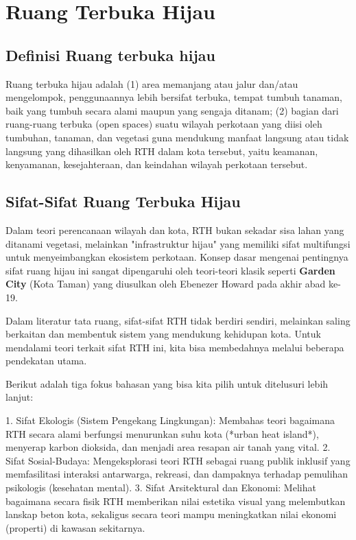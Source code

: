 \documentclass[../rumukota.tex]{subfiles}
\begin{document}
\section{Ruang Terbuka Hijau}%
\label{sec:Ruang Terbuka Hijau}

\subsection{Definisi Ruang terbuka hijau}%
\label{sub:definisi_ruang_terbuka_hijau}

Ruang terbuka hijau adalah
(1) area memanjang atau jalur dan/atau mengelompok, penggunaannya lebih bersifat terbuka, tempat tumbuh tanaman, baik yang tumbuh secara alami maupun yang sengaja ditanam; (2) bagian dari ruang-ruang terbuka (open spaces) suatu wilayah perkotaan yang diisi oleh tumbuhan, tanaman, dan vegetasi guna mendukung manfaat langsung atau tidak langsung yang dihasilkan oleh RTH dalam kota tersebut, yaitu keamanan, kenyamanan, kesejahteraan, dan keindahan wilayah perkotaan tersebut.

\subsection{Sifat-Sifat Ruang Terbuka Hijau}%
\label{ssub:Sifat-Sifat Ruang Terbuka Hijau}
Dalam teori perencanaan wilayah dan kota, RTH bukan sekadar sisa lahan yang ditanami vegetasi, melainkan "infrastruktur hijau" yang memiliki sifat multifungsi untuk menyeimbangkan ekosistem perkotaan. Konsep dasar mengenai pentingnya sifat ruang hijau ini sangat dipengaruhi oleh teori-teori klasik seperti \textbf{Garden City} (Kota Taman) yang diusulkan oleh Ebenezer Howard pada akhir abad ke-19.

Dalam literatur tata ruang, sifat-sifat RTH tidak berdiri sendiri, melainkan saling berkaitan dan membentuk sistem yang mendukung kehidupan kota. Untuk mendalami teori terkait sifat RTH ini, kita bisa membedahnya melalui beberapa pendekatan utama.

Berikut adalah tiga fokus bahasan yang bisa kita pilih untuk ditelusuri lebih lanjut:

1. Sifat Ekologis (Sistem Pengekang Lingkungan): Membahas teori bagaimana RTH secara alami berfungsi menurunkan suhu kota (*urban heat island*), menyerap karbon dioksida, dan menjadi area resapan air tanah yang vital.
2. Sifat Sosial-Budaya: Mengeksplorasi teori RTH sebagai ruang publik inklusif yang memfasilitasi interaksi antarwarga, rekreasi, dan dampaknya terhadap pemulihan psikologis (kesehatan mental).
3. Sifat Arsitektural dan Ekonomi: Melihat bagaimana secara fisik RTH memberikan nilai estetika visual yang melembutkan lanskap beton kota, sekaligus secara teori mampu meningkatkan nilai ekonomi (properti) di kawasan sekitarnya.
\end{document}
